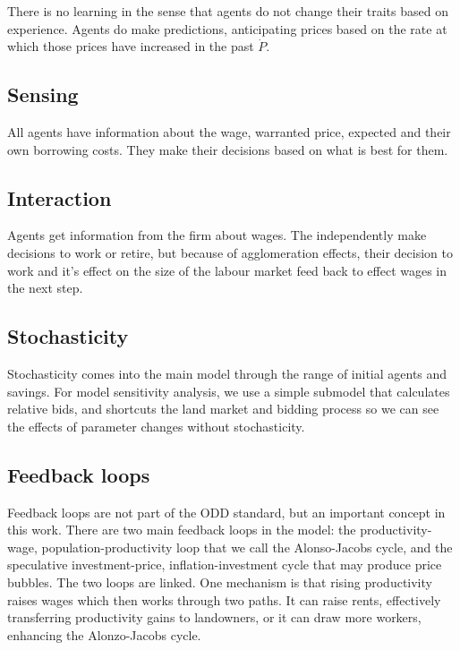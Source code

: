 

There is no learning in the sense that agents do not change their  traits based on experience. 
Agents do make predictions, anticipating prices based on the rate at which those prices have increased in the past $\dot P$.

\subsection{Sensing}
All agents have information about the wage, warranted price, expected and their own borrowing costs. They make their decisions based on what is best for them. 

\subsection{Interaction}
Agents get information from the firm about wages. The independently make decisions to work or retire, but because of agglomeration effects, their decision to work and it's effect on the size of the labour market feed back to effect wages in the next step. 

\subsection{Stochasticity}
Stochasticity comes into the main model through the range of initial agents and savings. For model sensitivity analysis, we use a simple submodel that calculates relative bids, and shortcuts the land market and bidding process so we can see the effects of parameter changes without stochasticity. 

\subsection{Feedback loops}
Feedback loops are not part of the ODD standard, but an important concept in this work. 
There are two main \glspl{feedback loop} in the model: the productivity-wage, population-productivity loop that we call the Alonso-Jacobs cycle, and the speculative investment-price, inflation-investment cycle that may produce price bubbles. 
The two loops are linked. One mechanism is that rising productivity raises wages which then works through two paths. It can raise rents, effectively transferring productivity gains to landowners, or it can draw more workers, enhancing the \Gls{Alonzo-Jacobs cycle}. 

